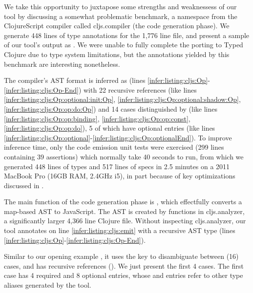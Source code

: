 We take this opportunity to juxtapose some strengths and weaknessess
of our tool by discussing a somewhat problematic benchmark,
a namespace from the ClojureScript compiler called cljs.compiler
(the code generation phase).
We generate 448 lines of type annotations
for the 1,776 line file, and present a sample
of our tool's output as .
We were unable to fully complete the porting to Typed Clojure due to
type system limitations, but the annotations yielded by this benchmark
are interesting nonetheless.

The compiler's AST format is inferred as  (lines \ref{infer:listing:cljs:Op}-\ref{infer:listing:cljs:Op-End})
with 22 recursive references
(like lines \ref{infer:listing:cljs:Op:optional:init:Op}, \ref{infer:listing:cljs:Op:optional:shadow:Op}, \ref{infer:listing:cljs:Op:op:do:Op})
and 14 cases distinguished by  (like lines \ref{infer:listing:cljs:Op:op:binding},
\ref{infer:listing:cljs:Op:op:const}, \ref{infer:listing:cljs:Op:op:do}),
5 of which have optional entries (like lines \ref{infer:listing:cljs:Op:optional}-\ref{infer:listing:cljs:Op:optionalEnd}).
To improve inference time,
only the code emission unit tests were exercised (299 lines containing 39 assertions)
which normally take 40 seconds to run, from which we
generated 448 lines of types and 517 lines of specs
in 2.5 minutes on a 2011 MacBook Pro (16GB RAM, 2.4GHz i5),
in part because of key optimizations discussed in .

The main function of the code generation phase is , which
effectfully converts a map-based AST
to JavaScript.
The AST is created by functions in cljs.analyzer,
a significantly larger 4,366 line Clojure file.
Without inspecting cljs.analyzer,
our tool annotates  on line \ref{infer:listing:cljs:emit}
with a recursive AST type  (lines \ref{infer:listing:cljs:Op}-\ref{infer:listing:cljs:Op-End}).

Similar to our opening example , it uses the 
key to disambiguate between (16) cases, and has recursive
references ().
We just present the first 4 cases.
The first case  has 4 required
and 8 optional entries, whose
 and  entries refer to
other  type aliases generated by the tool.

